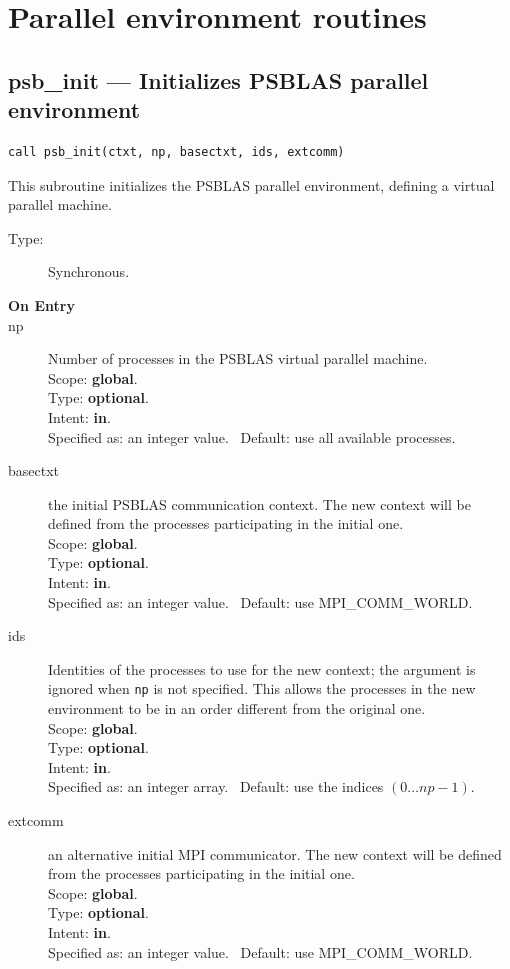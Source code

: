 

\section{Parallel environment routines}
\label{sec:parenv}

\clearpage\subsection{psb\_init --- Initializes PSBLAS parallel
  environment}

\begin{verbatim}
call psb_init(ctxt, np, basectxt, ids, extcomm)
\end{verbatim}

This subroutine initializes the PSBLAS parallel environment, defining
a virtual parallel machine.
\begin{description}
\item[Type:] Synchronous.
\item[\bf  On Entry ]
\item[np] Number of processes in the PSBLAS virtual parallel machine.\\
Scope: {\bf global}.\\
Type: {\bf optional}.\\
Intent: {\bf in}.\\
Specified as: an integer value. \
Default: use all available processes.
\item[basectxt] the initial PSBLAS communication context. The new context
  will be defined from the processes participating in the initial one.\\
  Scope: {\bf global}.\\
Type: {\bf optional}.\\
Intent: {\bf in}.\\
Specified as: an integer value. \
Default: use MPI\_COMM\_WORLD.
\item[ids] Identities of the processes to use for the new context; the
  argument is ignored when \verb|np| is not specified. This allows the
  processes in the new environment to be in an order different from the
  original one.\\
  Scope: {\bf global}.\\
Type: {\bf optional}.\\
Intent: {\bf in}.\\
Specified as: an integer array. \
Default: use the indices $(0\dots np-1)$.  
\item[extcomm] an alternative initial MPI communicator. The new context
  will be defined from the processes participating in the initial one.\\
  Scope: {\bf global}.\\
Type: {\bf optional}.\\
Intent: {\bf in}.\\
Specified as: an integer value. \
Default: use MPI\_COMM\_WORLD.
\end{description}

